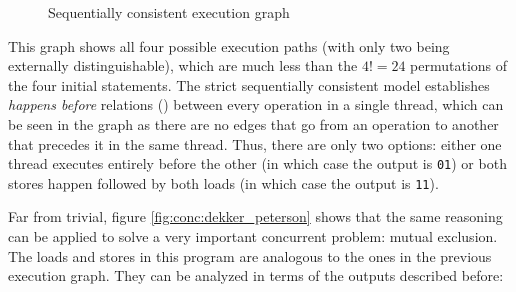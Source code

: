 \begin{figure}[ht]
    \centering
    \caption{Sequentially consistent execution graph}
    \label{fig:conc:seq}
\end{figure}

This graph shows all four possible execution paths (with only two being
externally distinguishable), which are much less than the $4! = 24$ permutations
of the four initial statements.  The strict sequentially consistent model
establishes \textit{happens before} relations (\cite{Lamport1978}) between every
operation in a single thread, which can be seen in the graph as there are no
edges that go from an operation to another that precedes it in the same thread.
Thus, there are only two options: either one thread executes entirely before the
other (in which case the output is \texttt{01}) or both stores happen followed
by both loads (in which case the output is \texttt{11}).

Far from trivial, figure \ref{fig:conc:dekker_peterson} shows that the same
reasoning can be applied to solve a very important concurrent problem: mutual
exclusion\footnotemark.  The loads and stores in this program are analogous to
the ones in the previous execution graph.  They can be analyzed in terms of the
outputs described before:

